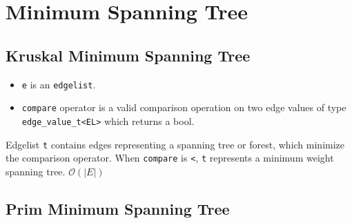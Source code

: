 \section{Minimum Spanning Tree}

\subsection{Kruskal Minimum Spanning Tree}

{\small
      
}
\begin{itemdescr}
      \pnum\preconditions
      \begin{itemize}
            \item
                  \lstinline{e} is an \lstinline{edgelist}.
            \item
                  \lstinline{compare} operator is a valid comparison operation on two edge values of type \lstinline{edge_value_t<EL>} which returns a bool.
      \end{itemize}
      \pnum\effects Edgelist \lstinline{t} contains edges representing a spanning tree or forest, which minimize the comparison operator. When \lstinline{compare} is \lstinline{<}, \lstinline{t} represents a minimum weight spanning tree.
      \pnum\complexity $\mathcal{O}(|E|)$
\end{itemdescr}

\subsection{Prim Minimum Spanning Tree}

